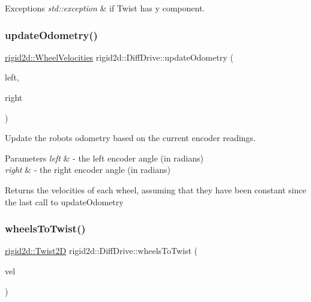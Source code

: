 \begin{DoxyExceptions}{Exceptions}
{\em std\+::exception} & if Twist has y component. \\
\hline
\end{DoxyExceptions}
\mbox{\label{classrigid2d_1_1DiffDrive_a0029cdde3c37edb7e7107416582bd72b}} 
\subsubsection{\texorpdfstring{update\+Odometry()}{updateOdometry()}}
{\footnotesize\ttfamily \hyperlink{structrigid2d_1_1WheelVelocities}{rigid2d\+::\+Wheel\+Velocities} rigid2d\+::\+Diff\+Drive\+::update\+Odometry (\begin{DoxyParamCaption}\item[{double}]{left,  }\item[{double}]{right }\end{DoxyParamCaption})}



Update the robot\textquotesingle{}s odometry based on the current encoder readings. 


\begin{DoxyParams}{Parameters}
{\em left} & -\/ the left encoder angle (in radians) \\
\hline
{\em right} & -\/ the right encoder angle (in radians) \\
\hline
\end{DoxyParams}
\begin{DoxyReturn}{Returns}
the velocities of each wheel, assuming that they have been constant since the last call to update\+Odometry 
\end{DoxyReturn}
\mbox{\label{classrigid2d_1_1DiffDrive_ae559cc4d15746a05cbd3ac73c1d47517}} 
\subsubsection{\texorpdfstring{wheels\+To\+Twist()}{wheelsToTwist()}}
{\footnotesize\ttfamily \hyperlink{classrigid2d_1_1Twist2D}{rigid2d\+::\+Twist2D} rigid2d\+::\+Diff\+Drive\+::wheels\+To\+Twist (\begin{DoxyParamCaption}\item[{\hyperlink{structrigid2d_1_1WheelVelocities}{rigid2d\+::\+Wheel\+Velocities}}]{vel }\end{DoxyParamCaption})}



